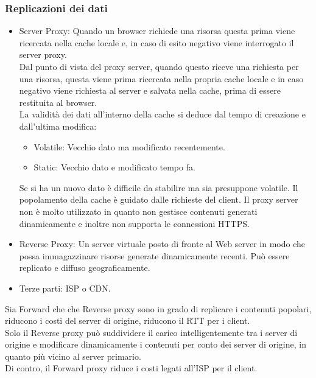 \documentclass{article}
\begin{document}
		\subsubsection{Replicazioni dei dati}
		\begin{itemize}
		    \item Server Proxy: Quando un browser richiede una risorsa questa prima viene ricercata nella cache locale e, in caso di esito negativo viene interrogato il server proxy.\\
		    
		    Dal punto di vista del proxy server, quando questo riceve una richiesta per una risorsa, questa viene prima ricercata nella propria cache locale e in caso negativo viene richiesta al server e salvata nella cache, prima di essere restituita al browser.\\
		    
		    La validità dei dati all'interno della cache si deduce dal tempo di creazione e dall'ultima modifica:
		    \begin{itemize}
		        \item Volatile: Vecchio dato ma modificato recentemente.
		        \item Static: Vecchio dato e modificato tempo fa.
		    \end{itemize}
		    Se si ha un nuovo dato è difficile da stabilire ma sia presuppone volatile.
		    Il popolamento della cache è guidato dalle richieste del client. Il proxy server non è molto utilizzato in quanto non gestisce contenuti generati dinamicamente e inoltre non supporta le connessioni HTTPS.
		    \item Reverse Proxy: Un server virtuale posto di fronte al Web server in modo che possa immagazzinare risorse generate dinamicamente recenti. Può essere replicato e diffuso geograficamente.
		    \item Terze parti: ISP o CDN.
		\end{itemize}
		Sia Forward che	che Reverse proxy sono in grado di replicare i contenuti popolari, riducono i costi del server di origine, riducono il RTT per i client.\\
		Solo il Reverse proxy può suddividere il carico intelligentemente tra i server di origine e modificare dinamicamente i contenuti per conto dei server di origine, in quanto più vicino al server primario.\\
		Di contro, il Forward proxy riduce i costi legati all'ISP per il client.\\
		
\end{document}
